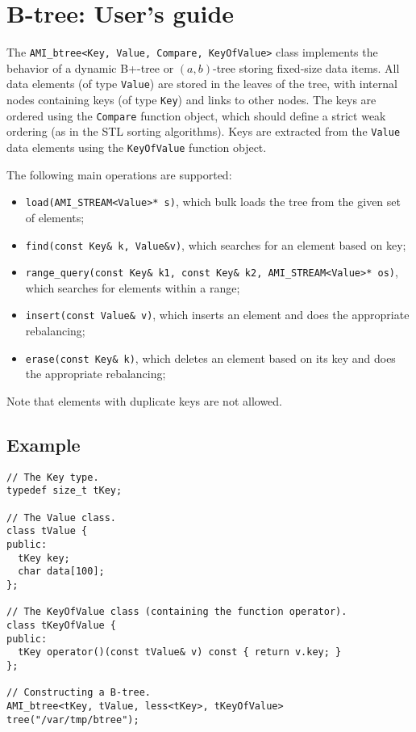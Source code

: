 
\chapter{B-tree: User's guide}
\label{btree:overview}
The {\tt AMI\_btree<Key, Value, Compare, KeyOfValue>} class implements the
behavior of a dynamic B+-tree or $(a,b)$-tree storing fixed-size data
items. All data elements (of type {\tt Value}) are stored in the leaves of
the tree, with internal nodes containing keys (of type {\tt Key}) and links
to other nodes. The keys are ordered using the {\tt Compare} function
object, which should define a strict weak ordering (as in the STL sorting
algorithms). Keys are extracted from the {\tt Value} data elements using
the {\tt KeyOfValue} function object.

The following main operations are supported:
\begin{itemize}

  \item {\tt load(AMI\_STREAM<Value>* s)}, which bulk loads the tree from
  the given set of elements;

  \item {\tt find(const Key\& k, Value\&v)}, which searches for an element
  based on key;

  \item {\tt range\_query(const Key\& k1, const Key\& k2,
  AMI\_STREAM<Value>* os)}, which searches for elements within a range;

  \item {\tt insert(const Value\& v)}, which inserts an element and does
  the appropriate rebalancing;

  \item {\tt erase(const Key\& k)}, which deletes an element based on its
  key and does the appropriate rebalancing;
\end{itemize}

Note that elements with duplicate keys are not allowed.


\section{Example}
{\small
\begin{verbatim}
// The Key type.
typedef size_t tKey;

// The Value class.
class tValue {
public:
  tKey key;
  char data[100];
};

// The KeyOfValue class (containing the function operator).
class tKeyOfValue {
public:
  tKey operator()(const tValue& v) const { return v.key; }
};

// Constructing a B-tree.
AMI_btree<tKey, tValue, less<tKey>, tKeyOfValue> tree("/var/tmp/btree");
\end{verbatim}
}

